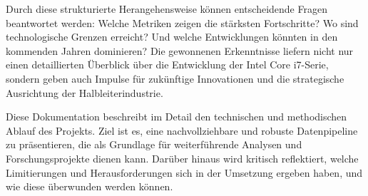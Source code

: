 Durch diese strukturierte Herangehensweise können entscheidende Fragen beantwortet werden: Welche Metriken zeigen die stärksten Fortschritte? Wo sind technologische Grenzen erreicht? Und welche Entwicklungen könnten in den kommenden Jahren dominieren? Die gewonnenen Erkenntnisse liefern nicht nur einen detaillierten Überblick über die Entwicklung der Intel Core i7-Serie, sondern geben auch Impulse für zukünftige Innovationen und die strategische Ausrichtung der Halbleiterindustrie.

Diese Dokumentation beschreibt im Detail den technischen und methodischen Ablauf des Projekts. Ziel ist es, eine nachvollziehbare und robuste Datenpipeline zu präsentieren, die als Grundlage für weiterführende Analysen und Forschungsprojekte dienen kann. Darüber hinaus wird kritisch reflektiert, welche Limitierungen und Herausforderungen sich in der Umsetzung ergeben haben, und wie diese überwunden werden können.
